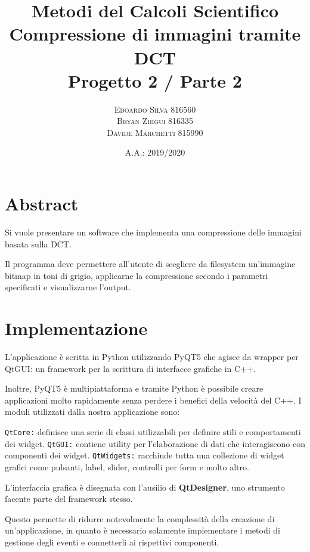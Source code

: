 \documentclass[11pt,italian]{article}
\title{
    Metodi del Calcoli Scientifico \\
    \normalsize Compressione di immagini tramite DCT \\
    \normalsize Progetto 2 / Parte 2
}
\date{A.A.: 2019/2020}
\author{
    \normalsize
    \textsc{Edoardo Silva 816560} \\
    \normalsize
    \textsc{Bryan Zhigui 816335} \\
    \normalsize
    \textsc{Davide Marchetti 815990}
}
\makeatletter
\newcommand*{\lstitem}[1][]{%
  \setbox0\hbox\bgroup
    \patchcmd{\lst@InlineM}{\@empty}{\@empty\egroup\item[\usebox0]\leavevmode\ignorespaces}{}{}%
    \lstinline[#1]%
}
\makeatother
\begin{document}
\maketitle

\section{Abstract}
Si vuole presentare un software che implementa una compressione delle immagini basata sulla DCT.

Il programma deve permettere all’utente di scegliere da filesystem un'immagine bitmap in toni di grigio, applicarne la compressione secondo i parametri specificati e visualizzarne l'output.

\newpage
\section{Implementazione}
L'applicazione è scritta in Python utilizzando PyQT5 che agisce da wrapper per QtGUI: un framework per la scrittura di interfacce grafiche in C++.

Inoltre, PyQT5 è multipiattaforma e tramite Python è possibile creare applicazioni molto rapidamente senza perdere i benefici della velocità del C++.
I moduli utilizzati dalla nostra applicazione sono:
\begin{description}
    \lstitem{QtCore:} definisce una serie di classi utilizzabili per definire stili e comportamenti dei widget.
    \lstitem{QtGUI:} contiene utility per l'elaborazione di dati che interagiscono con componenti dei widget.
    \lstitem{QtWidgets:} racchiude tutta una collezione di widget grafici come pulsanti, label, slider, controlli per form e molto altro.
\end{description}
L'interfaccia grafica è disegnata con l'ausilio di \textbf{QtDesigner}, uno strumento facente parte del framework stesso.

Questo permette di ridurre notevolmente la complessità della creazione di un'applicazione, in quanto è necessario solamente implementare i metodi di gestione degli eventi e connetterli ai rispettivi componenti.

\newpage
\end{document}
